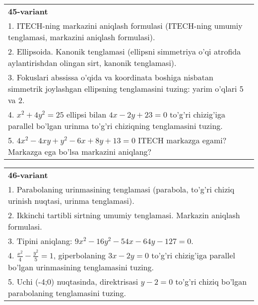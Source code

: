 \documentclass{article}
\begin{document}
\begin{tabular}{m{17cm}}
\textbf{45-variant}\\
1. ITECH-ning markazini aniqlash formulasi (ITECH-ning umumiy tenglamasi, markazini aniqlash formulasi).\\

2. Ellipsoida. Kanonik tenglamasi (ellipsni simmetriya o'qi atrofida aylantirishdan olingan sirt, kanonik tenglamasi).\\

3. Fokuslari abssissa o'qida va koordinata boshiga nisbatan simmetrik joylashgan ellipsning tenglamasini tuzing: yarim o'qlari 5 va 2.\\

4. $x^{2} + 4y^{2} = 25$ ellipsi bilan $4x - 2y + 23 = 0$ to'g'ri chizig'iga parallel bo'lgan urinma to'g'ri chiziqning tenglamasini tuzing.  \\

5. $4x^{2} - 4xy + y^{2} - 6x + 8y + 13 = 0$ ITECH markazga egami? Markazga ega bo'lsa markazini aniqlang?  
\end{tabular}
\vspace{1cm}


\begin{tabular}{m{17cm}}
\textbf{46-variant}\\
1. Parabolaning urinmasining tenglamasi (parabola, to'g'ri chiziq urinish nuqtasi, urinma tenglamasi).\\

2. Ikkinchi tartibli sirtning umumiy tenglamasi. Markazin aniqlash formulasi.\\

3. Tipini aniqlang: $9x^{2}-16y^{2}-54x-64y-127=0$.\\

4. $\frac{x^{2}}{4} - \frac{y^{2}}{5} = 1$, giperbolaning $3x - 2y = 0$ to'g'ri chizig'iga parallel bo'lgan urinmasining tenglamasini tuzing.  \\

5. Uchi (-4;0) nuqtasinda, direktrisasi $y - 2 = 0$ to'g'ri chiziq bo'lgan parabolaning tenglamasini tuzing.
\end{tabular}
\vspace{1cm}
\end{document}
